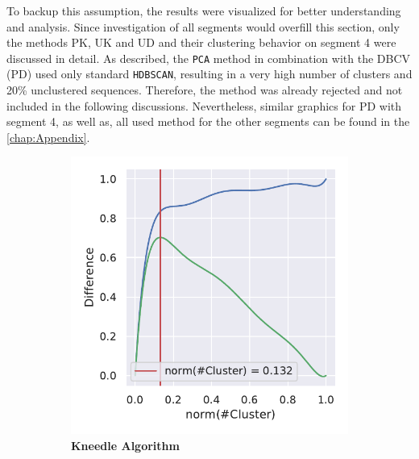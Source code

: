 \newpage

To backup this assumption, the results were visualized for better understanding and analysis. Since investigation of all segments would overfill this section, only the methods PK, UK and UD and their clustering behavior on segment 4 were discussed in detail. As described, the \texttt{PCA} method in combination with the \gls{DBCV} (PD) used only standard \texttt{HDBSCAN}, resulting in a very high number of clusters and 20\% unclustered sequences. Therefore, the method was already rejected and not included in the following discussions. Nevertheless, similar graphics for PD with segment 4, as well as, all used method for the other segments can be found in the \autoref{chap:Appendix}. 

\begin{figure}[!hbt]
    \centering
    \begin{subfigure}[b]{0.475\textwidth}
        \caption[Kneedle Algorithm]{\textbf{Kneedle Algorithm}}
        \label{subfig:PCA_Cluster_Knee_Kneedle_4}            \includegraphics[width=\textwidth]{PCA/Cluster_Knee_Segment_4.pdf}
    \end{subfigure}
    \hfill
    \begin{subfigure}[b]{0.475\textwidth}

\end{subfigure}
\end{figure}
